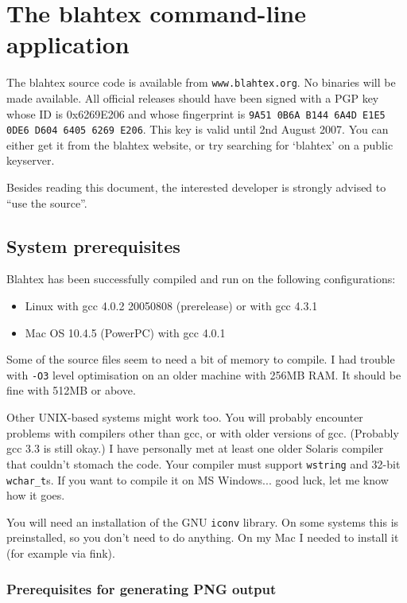 \documentclass{article}
\begin{document}
\section{The blahtex command-line application}\label{sec:command-line}

The blahtex source code is available from \texttt{www.blahtex.org}. No binaries will be made available. All official releases should have been signed with a PGP key  whose ID is 0x6269E206 and whose fingerprint is \texttt{9A51 0B6A B144 6A4D E1E5 0DE6 D604 6405 6269 E206}. This key is valid until 2nd August 2007. You can either get it from the blahtex website, or try searching for `blahtex' on a public keyserver.

Besides reading this document, the interested developer is strongly advised to ``use the source''.

\subsection{System prerequisites}\label{sec:prerequisites}

Blahtex has been successfully compiled and run on the following configurations:
\begin{itemize}
\item Linux with gcc 4.0.2 20050808 (prerelease) or with gcc 4.3.1
\item Mac OS 10.4.5 (PowerPC) with gcc 4.0.1
\end{itemize}

Some of the source files seem to need a bit of memory to compile. I had trouble with \texttt{-O3} level optimisation on an older machine with 256MB RAM. It should be fine with 512MB or above.

Other UNIX-based systems might work too. You will probably encounter problems with compilers other than gcc, or with older versions of gcc. (Probably gcc 3.3 is still okay.) I have personally met at least one older Solaris compiler that couldn't stomach the code. Your compiler must support \texttt{wstring} and 32-bit \texttt{wchar\_t}s. If you want to compile it on MS Windows... good luck, let me know how it goes.

You will need an installation of the GNU \texttt{iconv} library. On some systems this is preinstalled, so you don't need to do anything. On my Mac I needed to install it (for example via fink).

\subsubsection{Prerequisites for generating PNG output}
\end{document}
